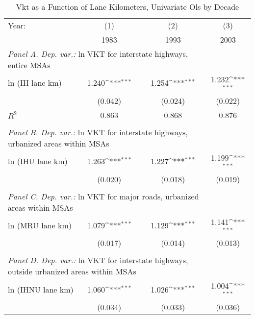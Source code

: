 \begin{table}[htbp]\centering
\def\sym#1{\ifmmode^{#1}\else\(^{#1}\)\fi}
\caption{Vkt
as
a
Function
of
Lane
Kilometers,
Univariate
Ols
by
Decade}
\begin{tabular}{l*{3}{c}}
\hline\hline
Year:
                    &\multicolumn{1}{c}{(1)}&\multicolumn{1}{c}{(2)}&\multicolumn{1}{c}{(3)}\\
                    &\multicolumn{1}{c}{1983}&\multicolumn{1}{c}{1993}&\multicolumn{1}{c}{2003}\\
 \hline \multicolumn{3}{l}{ \emph{Panel A. Dep. var.:} ln VKT for interstate  highways, entire MSAs } \\  
ln (IH lane km)     &       1.240\sym{***}&       1.254\sym{***}&       1.232\sym{***}\\
                    &     (0.042)         &     (0.024)         &     (0.022)         \\
 
\(R^{2}\)           &       0.863         &       0.868         &       0.876         \\
 
          \hline         \\         
\multicolumn{3}{l}{ \emph{Panel B. Dep. var.:} ln VKT for interstate highways, urbanized areas within MSAs } \\ 
ln (IHU lane km)    &       1.263\sym{***}&       1.227\sym{***}&       1.199\sym{***}\\
                    &     (0.020)         &     (0.018)         &     (0.019)         \\
 
 
          \hline         \\         
\multicolumn{3}{l}{ \emph{Panel C. Dep. var.:} ln VKT for major roads, urbanized areas within MSAs } \\ 
ln (MRU lane km)    &       1.079\sym{***}&       1.129\sym{***}&       1.141\sym{***}\\
                    &     (0.017)         &     (0.014)         &     (0.013)         \\
 
 
          \hline         \\         
\multicolumn{3}{l}{ \emph{Panel D. Dep. var.:} ln VKT for interstate highways, outside urbanized areas within MSAs } \\
ln (IHNU lane km)   &       1.060\sym{***}&       1.026\sym{***}&       1.004\sym{***}\\
                    &     (0.034)         &     (0.033)         &     (0.036)         \\
 

\end{tabular}
\end{table}
